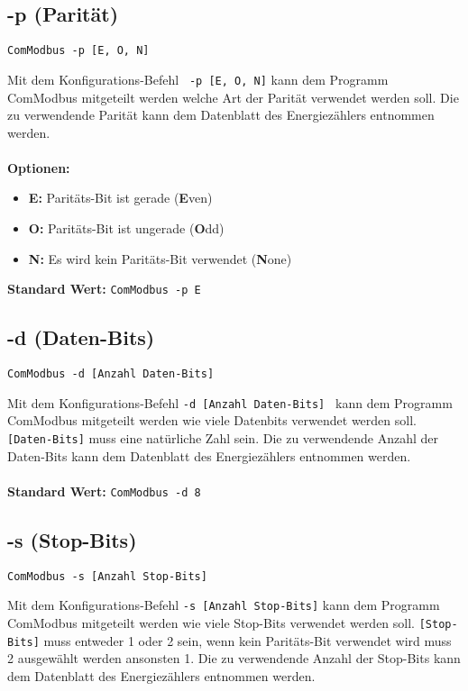 \documentclass[Bachelorarbeit.tex]{subfiles}
\begin{document}
\subsection*{-p (Parität)}
\begin{verbatim}
ComModbus -p [E, O, N]
\end{verbatim}
Mit dem Konfigurations-Befehl \texttt{ -p [E, O, N]} kann dem Programm ComModbus mitgeteilt werden welche Art der Parität verwendet werden soll. Die zu verwendende Parität kann dem Datenblatt des Energiezählers entnommen werden.\\
\\
\textbf{Optionen:}
\begin{itemize}
\itemsep0em
\item \textbf{E:} \tab Paritäts-Bit ist gerade (\textbf{E}ven)
\item \textbf{O:} \tab Paritäts-Bit ist ungerade (\textbf{O}dd)
\item \textbf{N:} \tab Es wird kein Paritäts-Bit verwendet (\textbf{N}one)
\end{itemize}

\textbf{Standard Wert:} \tab \texttt{ComModbus -p E}

\subsection*{-d (Daten-Bits)}
\begin{verbatim}
ComModbus -d [Anzahl Daten-Bits]
\end{verbatim}
Mit dem Konfigurations-Befehl \texttt{-d [Anzahl Daten-Bits] } kann dem Programm ComModbus mitgeteilt werden wie viele Datenbits verwendet werden soll. \texttt{[Daten-Bits]} muss eine natürliche Zahl sein. Die zu verwendende Anzahl der Daten-Bits kann dem Datenblatt des Energiezählers entnommen werden.\\
\\
\textbf{Standard Wert:} \tab \texttt{ComModbus -d 8}

\subsection*{-s (Stop-Bits)}
\begin{verbatim}
ComModbus -s [Anzahl Stop-Bits]
\end{verbatim}
Mit dem Konfigurations-Befehl \texttt{-s [Anzahl Stop-Bits]} kann dem Programm ComModbus mitgeteilt werden wie viele Stop-Bits verwendet werden soll. \texttt{[Stop-Bits]} muss entweder 1 oder 2 sein, wenn kein Paritäts-Bit verwendet wird muss 2 ausgewählt werden ansonsten 1. Die zu verwendende Anzahl der Stop-Bits kann dem Datenblatt des Energiezählers entnommen werden.
\end{document}

